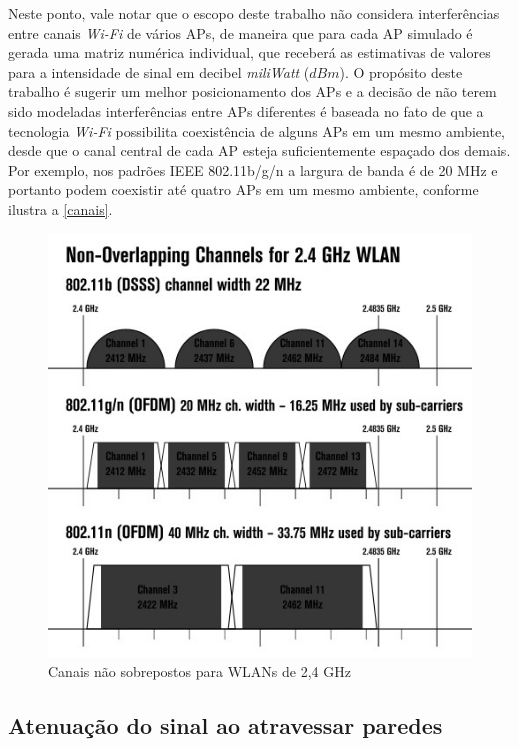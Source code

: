 \documentclass[
	12pt,				%
	twoside,			%
	a4paper,			%
	english,			%
	french,				%
	spanish,			%
	brazil				%
	]{abntex2}
\begin{document}
Neste ponto, vale notar que o escopo deste trabalho não considera
interferências entre canais \emph{Wi-Fi} de vários APs, de maneira que
para cada AP simulado é gerada uma matriz numérica individual, que
receberá as estimativas de valores para a intensidade de sinal em
decibel \emph{miliWatt} (\(dBm\)). O propósito deste trabalho é sugerir
um melhor posicionamento dos APs e a decisão de não terem sido modeladas
interferências entre APs diferentes é baseada no fato de que a
tecnologia \emph{Wi-Fi} possibilita coexistência de alguns APs em um
mesmo ambiente, desde que o canal central de cada AP esteja
suficientemente espaçado dos demais. Por exemplo, nos padrões IEEE
802.11b/g/n a largura de banda é de 20 MHz e portanto podem coexistir
até quatro APs em um mesmo ambiente, conforme ilustra a
\autoref{canais}.

\begin{figure}[htb]
    \caption{\label{canais} Canais não sobrepostos para WLANs de 2,4 GHz}
    \begin{center}
        \includegraphics[scale=0.6]{images/canais-1.jpg}
    \end{center}
\end{figure}

\subsection{Atenuação do sinal ao atravessar
paredes}\label{atenuauxe7uxe3o-do-sinal-ao-atravessar-paredes}
\end{document}
